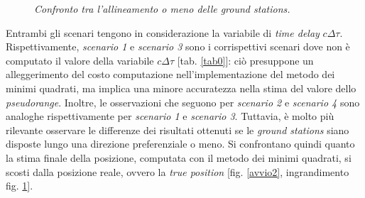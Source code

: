 \documentclass[a4paper,11pt,twoside]{book}
\begin{document}
	\begin{figure}[H]
		\centering
		\qquad
		\vspace{-0.3cm}
		\caption{\textit{Confronto tra l'allineamento o meno delle ground stations.}}
		\label{avvio}
	\end{figure}
	
	Entrambi gli scenari tengono in considerazione la variabile di \textit{time delay} $c \Delta \tau$. Rispettivamente, \textsl{scenario 1} e \textsl{scenario 3} sono i corrispettivi scenari dove non è computato il valore della variabile $c \Delta \tau$ [tab. \ref{tab0}]: ciò presuppone un alleggerimento del costo computazione nell'implementazione del metodo dei minimi quadrati, ma implica una minore accuratezza nella stima del valore dello \textit{pseudorange}. Inoltre, le osservazioni che seguono per \textsl{scenario 2} e \textsl{scenario 4} sono analoghe rispettivamente per \textsl{scenario 1} e \textsl{scenario 3}. 
	Tuttavia, è molto più rilevante osservare le differenze dei risultati ottenuti se le \textit{ground stations} siano disposte lungo una direzione preferenziale o meno. Si confrontano quindi quanto la stima finale della posizione, computata con il metodo dei minimi quadrati, si scosti dalla posizione reale, ovvero la \textit{true position} [fig. \ref{avvio2}, ingrandimento fig. \ref{avvio}].
	
\end{document}
